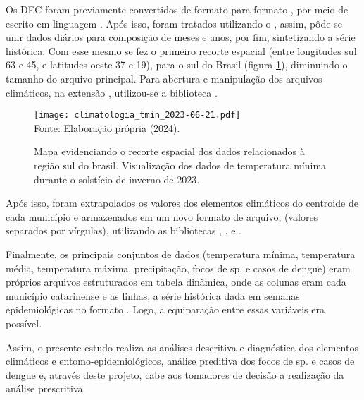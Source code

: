 \indent Os \acrshort{DEC} foram previamente convertidos de formato  para formato , por meio de  escrito em linguagem  \cite{shell_1999_heroldlinux, bash_2007_gnu-free}. Após isso, foram tratados utilizando o  \cite{CDO_2023_schulzweida}, assim, pôde-se unir dados diários para composição de meses e anos, por fim, sintetizando a série histórica. Com esse mesmo  se fez o primeiro recorte espacial (entre longitudes sul 63 e 45, e latitudes oeste 37 e 19), para o sul do Brasil (figura \ref{fig: sul_brasil}), diminuindo o tamanho do arquivo principal. Para abertura e manipulação dos arquivos climáticos, na extensão , utilizou-se a biblioteca  \cite{xarray_2016_v0_8_0, xarray_2017_hoyer}.

\begin{figure}[htbp]
    \centering
    \caption{Mapa evidenciando o recorte espacial dos dados relacionados à região sul do brasil. Visualização dos dados de temperatura mínima durante o solstício de inverno de 2023.}
    \texttt{[image: climatologia\_tmin\_2023-06-21.pdf]}
    \label{fig: sul_brasil}
    \\
    \vspace{-0.05cm}\hspace{-7.5cm}\small{Fonte: Elaboração própria (2024).} 
\end{figure}

\indent Após isso, foram extrapolados os valores dos elementos climáticos do centroide de cada município e armazenados em um novo formato de arquivo,  (valores separados por vírgulas), utilizando as bibliotecas , ,  e  \cite{shapely_2007_gillies}.

\indent Finalmente,  os principais conjuntos de dados (temperatura mínima, temperatura média, temperatura máxima, precipitação, focos de  sp. e casos de dengue) eram próprios arquivos estruturados em tabela dinâmica, onde as colunas eram cada município catarinense e as linhas, a série histórica dada em semanas epidemiológicas no formato . Logo, a equiparação entre essas variáveis era possível.

\indent Assim, o presente estudo realiza as análises descritiva e diagnóstica dos elementos climáticos e entomo-epidemiológicos,  análise preditiva dos focos de  sp. e casos de dengue e, através deste projeto, cabe aos tomadores de decisão a realização da análise prescritiva.


